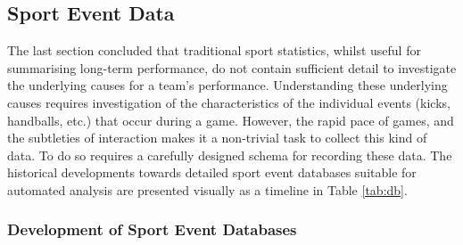 \subsection{Sport Event Data}\label{sport-event-data}

The last section concluded that traditional sport statistics,
whilst useful for summarising long-term performance, do not contain
sufficient detail to investigate the underlying causes for a team's
performance. Understanding these underlying causes requires investigation of the characteristics of the
individual events (kicks, handballs, etc.) that occur during a game.
However, the rapid pace of games, and the subtleties of interaction
makes it a non-trivial task to collect this kind of data. To do so
requires a carefully designed schema for recording these data. The
historical developments towards detailed sport event databases suitable
for automated analysis are presented visually as a timeline in Table
\ref{tab:db}.

\pagebreak

\subsubsection{Development of Sport Event
Databases}\label{development-of-sport-event-databases}

